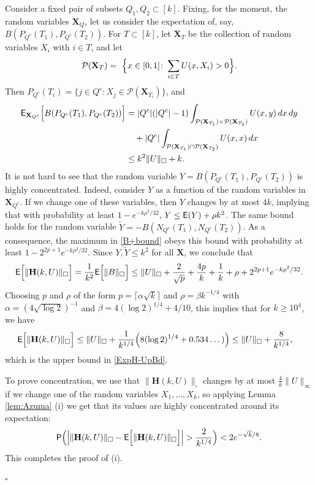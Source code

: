 \documentclass[12pt]{article}
\numberwithin{equation}{section}
\newenvironment{proof}{\medskip\noindent{\bf Proof.
}}{\hfill$\square$\medskip}
\def\Prob{{\sf P}}
\def\E{{\sf E}}
\def\bH{{\mathbf H}}
\def\bX{{\mathbf X}}
\begin{document}
\begin{proof}
Consider a fixed pair of subsets $Q_1,Q_2\subset [k]$. Fixing, for
the moment, the random variables $\bX_Q$, let us consider the
expectation of, say, $B(P_{Q^c}(T_1),P_{Q^c}(T_2))$. For $T\subset
[k]$, let ${\bX}_T$ be the collection of random variables $X_i$
with $i\in T$, and let
\[
{\mathcal P}(\bX_T)=\ \Bigl\{x\in [0,1]\colon \sum_{i\in T}
U(x,X_i)>0\Bigr\}.
\]
Then $P_{Q^c}(T_i)=\{j\in {Q^c}\colon X_j\in {\mathcal P}(\bX_{T_i})\}$, and
\[
\begin{aligned}
\E_{\bX_{Q^c}}\Bigl[B(P_{Q^c}(T_1),P_{Q^c}(T_2))\Bigr] &=
|Q^c|(|Q^c|-1)\int_{{\mathcal P}(\bX_{T_1})\times {\mathcal
P}(\bX_{T_2})} U(x,y)\,dx\,dy
\\
&\quad + |Q^c|\int_{{\mathcal P}(\bX_{T_1})\cap{\mathcal
P}(\bX_{T_2})} U(x,x)\,dx
\\
&\leq k^2\|U\|_\square +k.
\end{aligned}
\]
It is not hard to see that the random variable
$Y=B(P_{Q^c}(T_1),P_{Q^c}(T_2))$ is highly concentrated.  Indeed,
consider $Y$ as a function of the random variables in $\bX_{Q^c}$. If
we change one of these variables, then $Y$ changes by at most $4k$,
implying that with probability at least {$1-e^{-k\rho^2/32}$, $Y\leq
\E(Y)+\rho k^2$.} The same bound holds for the random variable
$\tilde Y=-B(N_{Q^c}(T_1),N_{Q^c}(T_2))$. As a consequence, the
maximum in \eqref{B+bound} obeys this bound with probability at least
$1-2^{2p+1}{ e^{-k\rho^2/32}}$. Since $Y,\tilde Y\leq k^2$ for all
$\bX$, we conclude that
\[
\E\Bigl[\|\bH(k,U)\|_\square \Bigr]= \frac
1{k^2}\E\Bigl[\|B\|_\square\Bigr] \leq \|U\|_\square+\frac {2}{\sqrt
p} + \frac{4p}k +\frac 1k + {\rho +2^{2p+1}e^{-k\rho^2/32}.}
\]
Choosing $p$ and $\rho$ of the form $p=\lceil\alpha \sqrt k\rceil$
and $\rho=\beta k^{-1/4}$ with $\alpha=(4\sqrt{\log 2})^{-1}$ and
$\beta=4(\log 2)^{1/4}+4/10$, this implies that for $k\geq 10^4$, we
have
\begin{equation}
\begin{aligned}
\E\Bigl[\|\bH(k,U)\|_\square \Bigr] &\leq\|U\|_\square+ \frac
{1}{k^{1/4}}\Bigl(8(\log 2)^{1/4}+0.534\dots)\Bigr) \leq
\|U\|_\square+\frac {8}{k^{1/4}},
\end{aligned}
\end{equation}
which is the upper bound in \eqref{ExpH-UpBd}.

To prove concentration, we use that $\|\bH(k,U)\|_\square$ changes by
at most $\frac 4k\|U\|_\infty$
if we change one of the random variables $X_1,\dots,
X_k$, so applying Lemma \ref{lem:Azuma} (i)
we get that its values are
highly concentrated around its expectation:
\[
\Prob\Bigl(\Bigl|\|\bH(k,U)\|_\square -
\E\Bigl[\|\bH(k,U)\|_\square\Bigr]\Bigr|
>{\frac{2}{k^{1/4}}}\Bigr)
< 2e^{-\sqrt k/8}.
\]
This completes the proof of (i).


\end{proof}
\end{document}
